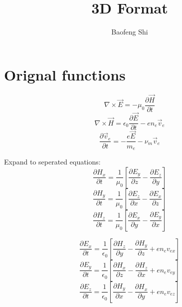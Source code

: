 \documentclass[a4paper,10pt]{article}
\title{3D Format}
\author{Baofeng Shi}
\begin{document}
\maketitle
\section{Orignal functions}
\begin{equation}
\nabla \times \vec{E}=-\mu_{0}\frac{\partial \vec{H}}{\partial t}
\end{equation}
\begin{equation}
\nabla \times \vec{H}=\epsilon_{0}\frac{\partial \vec{E}}{\partial t}-e n_{e}\vec{v}_{e}
\end{equation}
\begin{equation}
\frac{\partial\vec{v}_{e}}{\partial t}=-\frac{e\vec{E}}{m_{e}}-\nu_{m}\vec{v}_{e}
\end{equation}

Expand to seperated equations:
\begin{equation}\label{eqHx}
\frac{\partial H_{x}}{\partial t}=\frac{1}{\mu_{0}}\left[\frac{\partial E_{y}}{\partial z}-\frac{\partial E_{z}}{\partial y}\right]
\end{equation}
\begin{equation}\label{eqHy}
\frac{\partial H_{y}}{\partial t}=\frac{1}{\mu_{0}}\left[\frac{\partial E_{z}}{\partial x}-\frac{\partial E_{x}}{\partial z}\right]
\end{equation}
\begin{equation}\label{eqHz}
\frac{\partial H_{z}}{\partial t}=\frac{1}{\mu_{0}}\left[\frac{\partial E_{x}}{\partial y}-\frac{\partial E_{y}}{\partial x}\right]
\end{equation}

\begin{equation}\label{eqEx}
\frac{\partial E_{x}}{\partial t}=\frac{1}{\epsilon_{0}}\left[\frac{\partial H_{z}}{\partial y}-\frac{\partial H_{y}}{\partial z}+e n_{e}v_{ex}\right]
\end{equation}
\begin{equation}\label{eqEy}
\frac{\partial E_{y}}{\partial t}=\frac{1}{\epsilon_{0}}\left[\frac{\partial H_{x}}{\partial z}-\frac{\partial H_{z}}{\partial x}+e n_{e}v_{ey}\right]
\end{equation}
\begin{equation}\label{eqEz}
\frac{\partial E_{z}}{\partial t}=\frac{1}{\epsilon_{0}}\left[\frac{\partial H_{y}}{\partial x}-\frac{\partial H_{x}}{\partial y}+e n_{e}v_{ez}\right]
\end{equation}
\end{document}
